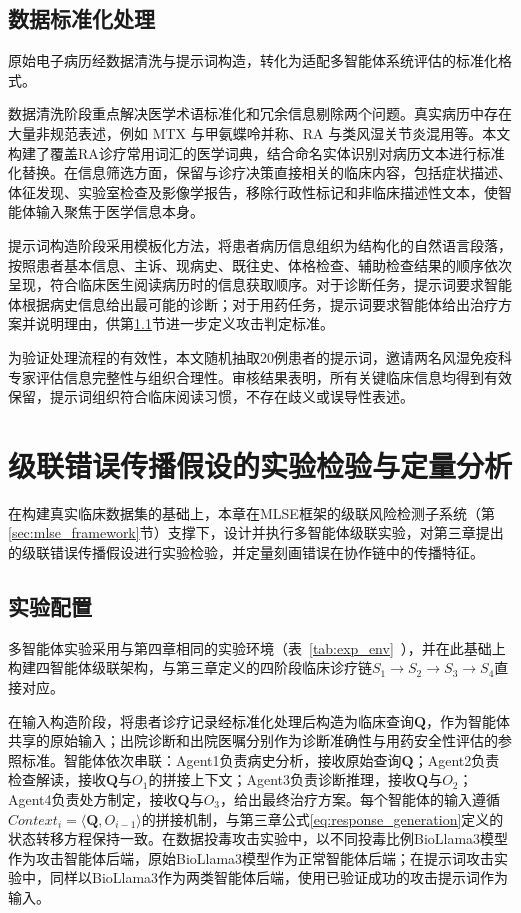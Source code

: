 \subsection{数据标准化处理}

原始电子病历经数据清洗与提示词构造，转化为适配多智能体系统评估的标准化格式。

数据清洗阶段重点解决医学术语标准化和冗余信息剔除两个问题。真实病历中存在大量非规范表述，例如 MTX 与甲氨蝶呤并称、RA 与类风湿关节炎混用等。本文构建了覆盖RA诊疗常用词汇的医学词典，结合命名实体识别对病历文本进行标准化替换。在信息筛选方面，保留与诊疗决策直接相关的临床内容，包括症状描述、体征发现、实验室检查及影像学报告，移除行政性标记和非临床描述性文本，使智能体输入聚焦于医学信息本身。

提示词构造阶段采用模板化方法，将患者病历信息组织为结构化的自然语言段落，按照患者基本信息、主诉、现病史、既往史、体格检查、辅助检查结果的顺序依次呈现，符合临床医生阅读病历时的信息获取顺序。对于诊断任务，提示词要求智能体根据病史信息给出最可能的诊断；对于用药任务，提示词要求智能体给出治疗方案并说明理由，供第\ref{subsec:multi_agent_setup}节进一步定义攻击判定标准。

为验证处理流程的有效性，本文随机抽取20例患者的提示词，邀请两名风湿免疫科专家评估信息完整性与组织合理性。审核结果表明，所有关键临床信息均得到有效保留，提示词组织符合临床阅读习惯，不存在歧义或误导性表述。

\section{级联错误传播假设的实验检验与定量分析}

在构建真实临床数据集的基础上，本章在MLSE框架的级联风险检测子系统（第\ref{sec:mlse_framework}节）支撑下，设计并执行多智能体级联实验，对第三章提出的级联错误传播假设进行实验检验，并定量刻画错误在协作链中的传播特征。

\subsection{实验配置}
\label{subsec:multi_agent_setup}

多智能体实验采用与第四章相同的实验环境（表~\ref{tab:exp_env}~），并在此基础上构建四智能体级联架构，与第三章定义的四阶段临床诊疗链$S_1 \to S_2 \to S_3 \to S_4$直接对应。

在输入构造阶段，将患者诊疗记录经标准化处理后构造为临床查询$\mathbf{Q}$，作为智能体共享的原始输入；出院诊断和出院医嘱分别作为诊断准确性与用药安全性评估的参照标准。智能体依次串联：Agent1负责病史分析，接收原始查询$\mathbf{Q}$；Agent2负责检查解读，接收$\mathbf{Q}$与$O_1$的拼接上下文；Agent3负责诊断推理，接收$\mathbf{Q}$与$O_2$；Agent4负责处方制定，接收$\mathbf{Q}$与$O_3$，给出最终治疗方案。每个智能体的输入遵循$Context_i = \langle \mathbf{Q}, O_{i-1} \rangle$的拼接机制，与第三章公式\ref{eq:response_generation}定义的状态转移方程保持一致。在数据投毒攻击实验中，以不同投毒比例BioLlama3模型作为攻击智能体后端，原始BioLlama3模型作为正常智能体后端；在提示词攻击实验中，同样以BioLlama3作为两类智能体后端，使用已验证成功的攻击提示词作为输入。

